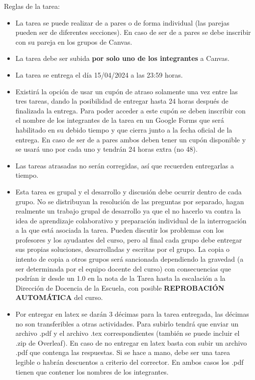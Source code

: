 \documentclass[addpoints,10pt]{exam}
\begin{document}
Reglas de la tarea:
\begin{itemize}
    \item La tarea se puede realizar de a pares o de forma individual (las parejas pueden ser de diferentes secciones). En caso de ser de a pares se debe inscribir con su pareja en los grupos de Canvas. 

    \item La tarea debe ser subida \textbf{por solo uno de los integrantes} a Canvas.
    
    \item La tarea se entrega el día 15/04/2024 a las 23:59 horas. 
    
    \item Existirá la opción de usar un cupón de atraso solamente una vez entre las tres tareas, dando la posibilidad de entregar hasta 24 horas después de finalizada la entrega. Para poder acceder a este cupón se deben inscribir con el nombre de los integrantes de la tarea en un Google Forms que será habilitado en su debido tiempo y que cierra junto a la fecha oficial de la entrega. En caso de ser de a pares ambos deben tener un cupón disponible y se usará uno por cada uno y tendrán 24 horas extra (no 48).

    \item Las tareas atrasadas no serán corregidas, así que recuerden entregarlas a tiempo. 

    \item Esta tarea es grupal y el desarrollo y discusión debe ocurrir dentro de cada grupo. No se distribuyan la resolución de las preguntas por separado, hagan realmente un trabajo grupal de desarrollo ya que el no hacerlo va contra la idea de aprendizaje colaborativo y preparación individual de la interrogación a la que está asociada la tarea. Pueden discutir los problemas con los profesores y los ayudantes del curso, pero al final cada grupo debe entregar sus propias soluciones, desarrolladas y escritas por el grupo. La copia o intento de copia a otros grupos será sancionada dependiendo la gravedad (a ser determinada por el equipo docente del curso) con consecuencias que podrían ir desde un 1.0 en la nota de la Tarea hasta la escalación a la Dirección de Docencia de la Escuela, con posible \textbf{REPROBACIÓN AUTOMÁTICA} del curso.
    
    \item Por entregar en latex se darán 3 décimas para la tarea entregada, las décimas no son transferibles a otras actividades. Para subirlo tendrá que enviar un archivo .pdf y el archivo .tex correspondientes (también se puede incluir el .zip de Overleaf). En caso de no entregar en latex basta con subir un archivo .pdf que contenga las respuestas. Si se hace a mano, debe ser una tarea legible o habrán descuentos a criterio del corrector. En ambos casos los .pdf tienen que contener los nombres de los integrantes.


\end{itemize}
\end{document}
